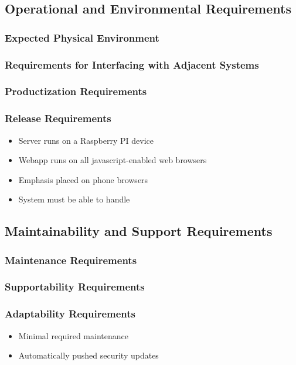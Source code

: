 \documentclass[12pt, titlepage]{article}
\begin{document}
\subsection{Operational and Environmental Requirements}
\subsubsection{Expected Physical Environment}
\subsubsection{Requirements for Interfacing with Adjacent Systems}
\subsubsection{Productization Requirements}
\subsubsection{Release Requirements}

\begin{itemize}
\item Server runs on a Raspberry PI device
\item Webapp runs on all javascript-enabled web browsers
\item Emphasis placed on phone browsers
\item System must be able to handle
\end{itemize}

\subsection{Maintainability and Support Requirements}
\subsubsection{Maintenance Requirements}
\subsubsection{Supportability Requirements}
\subsubsection{Adaptability Requirements}
\begin{itemize}
\item Minimal required maintenance
\item Automatically pushed security updates
\end{itemize}
\end{document}
